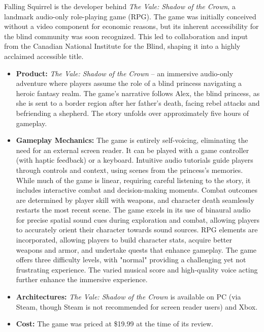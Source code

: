 Falling Squirrel is the developer behind \textit{The Vale: Shadow of the Crown}, a landmark audio-only role-playing game (RPG)\supercite{AFBValeReview}. The game was initially conceived without a video component for economic reasons, but its inherent accessibility for the blind community was soon recognized. This led to collaboration and input from the Canadian National Institute for the Blind, shaping it into a highly acclaimed accessible title\supercite{AFBValeReview}.
\begin{itemize}
    \item \textbf{Product:} \textit{The Vale: Shadow of the Crown} – an immersive audio-only adventure where players assume the role of a blind princess navigating a heroic fantasy realm\supercite{AFBValeReview}. The game's narrative follows Alex, the blind princess, as she is sent to a border region after her father's death, facing rebel attacks and befriending a shepherd\supercite{AFBValeReview}. The story unfolds over approximately five hours of gameplay\supercite{AFBValeReview}.
    \item \textbf{Gameplay Mechanics:} The game is entirely self-voicing, eliminating the need for an external screen reader\supercite{AFBValeReview}. It can be played with a game controller (with haptic feedback) or a keyboard\supercite{AFBValeReview}. Intuitive audio tutorials guide players through controls and context, using scenes from the princess's memories\supercite{AFBValeReview}. While much of the game is linear, requiring careful listening to the story, it includes interactive combat and decision-making moments\supercite{AFBValeReview}. Combat outcomes are determined by player skill with weapons, and character death seamlessly restarts the most recent scene\supercite{AFBValeReview}. The game excels in its use of binaural audio for precise spatial sound cues during exploration and combat, allowing players to accurately orient their character towards sound sources\supercite{AFBValeReview}. RPG elements are incorporated, allowing players to build character stats, acquire better weapons and armor, and undertake quests that enhance gameplay\supercite{AFBValeReview}. The game offers three difficulty levels, with "normal" providing a challenging yet not frustrating experience\supercite{AFBValeReview}. The varied musical score and high-quality voice acting further enhance the immersive experience\supercite{AFBValeReview}.
    \item \textbf{Architectures:} \textit{The Vale: Shadow of the Crown} is available on PC (via Steam, though Steam is not recommended for screen reader users) and Xbox\supercite{AFBValeReview}.
    \item \textbf{Cost:} The game was priced at \$19.99 at the time of its review\supercite{AFBValeReview}.
\end{itemize}

